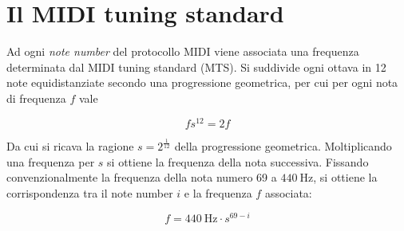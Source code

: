 \section{Il MIDI tuning standard}
Ad ogni \textit{note number} del protocollo MIDI viene associata una frequenza determinata dal MIDI tuning standard (MTS).
Si suddivide ogni ottava in 12 note equidistanziate secondo una progressione geometrica, per cui per ogni nota di frequenza $f$ vale

\[
fs^{12} = 2f 
\]

Da cui si ricava la ragione $s=2^{\frac{1}{12}}$ della progressione geometrica. Moltiplicando una frequenza per $s$ si ottiene la frequenza della nota successiva.
Fissando convenzionalmente la frequenza della nota numero 69 a $ \SI{440}{\hertz}$, si ottiene la corrispondenza tra
il note number $i$ e la frequenza $f$ associata:

\[
f = \SI{440}{\hertz} \cdot s^{69-i}
\]


